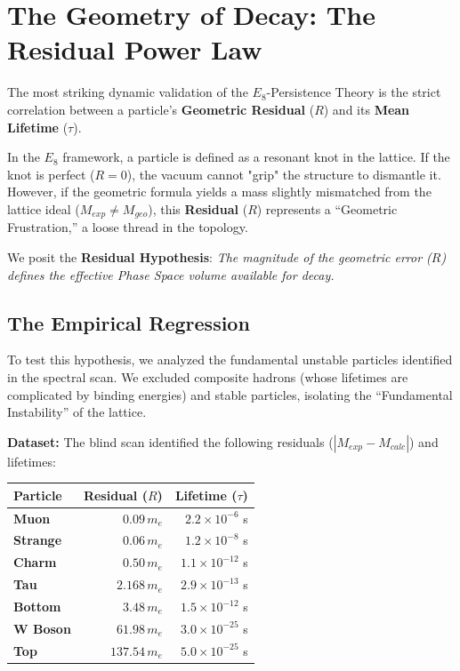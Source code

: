 \section{The Geometry of Decay: The Residual Power Law}

The most striking dynamic validation of the $E_8$-Persistence Theory is the strict correlation between a particle's \textbf{Geometric Residual} ($R$) and its \textbf{Mean Lifetime} ($\tau$).

In the $E_8$ framework, a particle is defined as a resonant knot in the lattice. If the knot is perfect ($R=0$), the vacuum cannot "grip" the structure to dismantle it. However, if the geometric formula yields a mass slightly mismatched from the lattice ideal ($M_{exp} \neq M_{geo}$), this \textbf{Residual} ($R$) represents a ``Geometric Frustration,'' a loose thread in the topology.

We posit the \textbf{Residual Hypothesis}: \textit{The magnitude of the geometric error ($R$) defines the effective Phase Space volume available for decay.}

\subsection{The Empirical Regression}

To test this hypothesis, we analyzed the fundamental unstable particles identified in the spectral scan. We excluded composite hadrons (whose lifetimes are complicated by binding energies) and stable particles, isolating the ``Fundamental Instability'' of the lattice.

\textbf{Dataset:} The blind scan identified the following residuals ($|M_{exp} - M_{calc}|$) and lifetimes:

\begin{table}[h]
\centering
\begin{tabular}{lrr}
\toprule
\textbf{Particle} & \textbf{Residual ($R$)} & \textbf{Lifetime ($\tau$)} \\ \midrule
\textbf{Muon}     & $0.09 \, m_e$           & $2.2 \times 10^{-6}$ s \\
\textbf{Strange}  & $0.06 \, m_e$           & $1.2 \times 10^{-8}$ s \\
\textbf{Charm}    & $0.50 \, m_e$           & $1.1 \times 10^{-12}$ s \\
\textbf{Tau}      & $2.168 \, m_e$          & $2.9 \times 10^{-13}$ s \\
\textbf{Bottom}   & $3.48 \, m_e$           & $1.5 \times 10^{-12}$ s \\
\textbf{W Boson}  & $61.98 \, m_e$          & $3.0 \times 10^{-25}$ s \\
\textbf{Top}      & $137.54 \, m_e$         & $5.0 \times 10^{-25}$ s \\ \bottomrule
\end{tabular}
\end{table}

